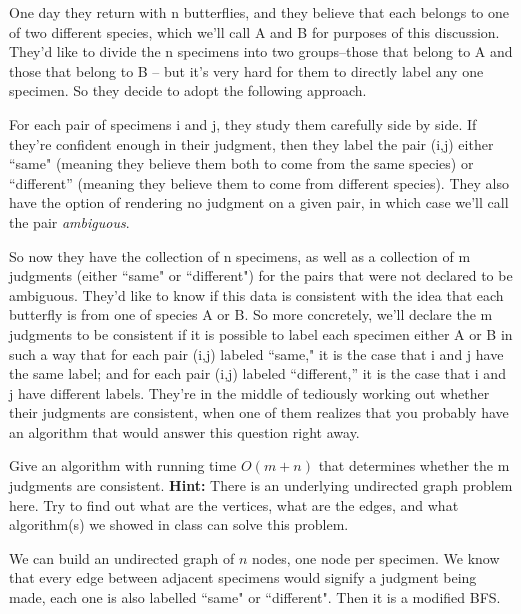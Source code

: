 \documentclass[letterpaper, 11pt]{article}
\begin{document}
\begin{enumerate}
    One day they return with n butterflies, and they believe that each belongs to one of two different species, which we’ll call A and B for purposes of this discussion. They’d like to divide the n specimens into two groups–those that belong to A and those that belong to B – but it’s very hard for them to directly label any one specimen. So they decide to adopt the following approach.

    For each pair of specimens i and j, they study them carefully side by side. If they're confident enough in their judgment, then they label the pair (i,j) either ``same" (meaning they believe them both to come from the same species) or ``different” (meaning they believe them to come from different species). They also have the option of rendering no judgment on a given pair, in which case we’ll call the pair \textit{ambiguous}.

    So now they have the collection of n specimens, as well as a collection of m judgments (either ``same" or ``different") for the pairs that were not declared to be ambiguous. They’d like to know if this data is consistent with the idea that each butterfly is from one of species A or B. So more concretely, we’ll declare the m judgments to be consistent if it is possible to label each specimen either A or B in such a way that for each pair (i,j) labeled ``same," it is the case that i and j have the same label; and for each pair (i,j) labeled ``different,” it is the case that i and j have different labels. They’re in the middle of tediously working out whether their judgments are consistent, when one of them realizes that you probably have an algorithm that would answer this question right away.

    Give an algorithm with running time $O(m+n)$ that determines whether the m judgments are consistent. \textbf{Hint:} There is an underlying undirected graph problem here. Try to find out what are the vertices, what are the edges, and what algorithm(s) we showed in class can solve this problem.

    We can build an undirected graph of $n$ nodes, one node per specimen. We know that every edge between adjacent specimens would signify a judgment being made, each one is also labelled ``same" or ``different". Then it is a modified BFS.


\end{enumerate}
\end{document}
